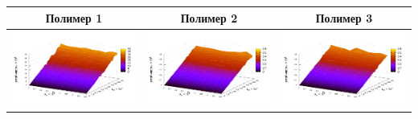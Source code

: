 \documentclass[12pt,a4paper]{article}
\theoremstyle{definition}
\begin{document}
\begin{table}[h]
  \centering
  \begin{tabular}{c c c}
	Полимер 1 & Полимер 2 & Полимер 3 \\ \hline
	\includegraphics[scale=0.4]{figs/all/p1.txt_coeff1.dat.pdf} & \includegraphics[scale=0.4]{figs/all/p2.txt_coeff0.dat.pdf} & \includegraphics[scale=0.4]{figs/all/p3.txt_coeff0.dat.pdf} \\

\end{tabular}
\end{table}
\end{document}
